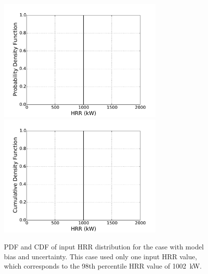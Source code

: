 \documentclass[12pt]{article}
\begin{document}
\clearpage


\begin{figure}[p]
\includegraphics[width=3.2in]{Figures/input_PDF_point}
\includegraphics[width=3.2in]{Figures/input_CDF_point}
\caption{PDF and CDF of input HRR distribution for the case with model bias and uncertainty. This case used only one input HRR value, which corresponds to the 98th percentile HRR value of 1002~kW.}
\label{fig:case_1_input_distributions}
\end{figure}
\end{document}
